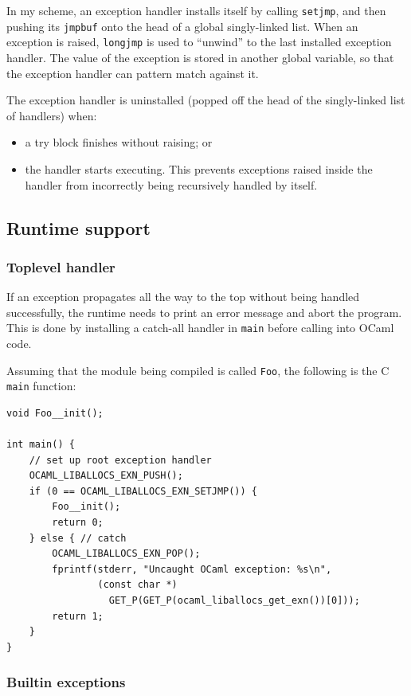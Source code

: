 \documentclass[12pt,a4paper,twoside,openright]{report}
\begin{document}
In my scheme, an exception handler installs itself by calling
\lstinline!setjmp!, and then pushing its \lstinline!jmpbuf! onto the head of a
global singly-linked list.
When an exception is raised, \lstinline!longjmp! is used to
``unwind'' to the last installed exception handler. The value of the exception
is stored in another global variable, so that the
exception handler can pattern match against it.

The exception handler is uninstalled (popped off the head of the
singly-linked list of handlers) when:
\begin{itemize}
  \item a try block finishes without raising; or
  \item the handler starts executing. This prevents exceptions raised inside the
      handler from incorrectly being recursively handled by itself.
\end{itemize}

\subsection{Runtime support}\label{exceptions-runtime-support}

\subsubsection{Toplevel handler}

If an exception propagates all the way to the top without being handled
successfully, the runtime needs to print an error message and abort the
program. This is done by installing a catch-all handler in \lstinline!main! before
calling into OCaml code.

Assuming that the module being compiled is called \lstinline!Foo!, the
following is the C \lstinline!main! function:

\begin{lstlisting}
void Foo__init();

int main() {
    // set up root exception handler
    OCAML_LIBALLOCS_EXN_PUSH();
    if (0 == OCAML_LIBALLOCS_EXN_SETJMP()) {
        Foo__init();
        return 0;
    } else { // catch
        OCAML_LIBALLOCS_EXN_POP();
        fprintf(stderr, "Uncaught OCaml exception: %s\n",
                (const char *)
                  GET_P(GET_P(ocaml_liballocs_get_exn())[0]));
        return 1;
    }
}
\end{lstlisting}

\subsubsection{Builtin exceptions}\label{builtin-exceptions}
\end{document}
